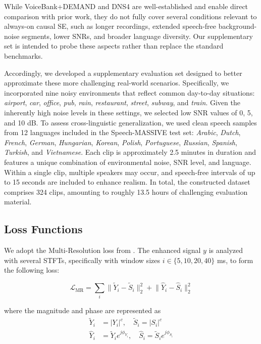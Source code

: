 \documentclass[final,5p,times,authoryear]{elsarticle}
\begin{document}
While VoiceBank+DEMAND and DNS4 are well-established and enable direct comparison with prior work, they do not fully cover several conditions relevant to always-on causal SE, such as longer recordings, extended speech-free background-noise segments, lower SNRs, and broader language diversity. Our supplementary set is intended to probe these aspects rather than replace the standard benchmarks.

Accordingly, we developed a supplementary evaluation set designed to better approximate these more challenging real-world scenarios. Specifically, we incorporated nine noisy environments that reflect common day-to-day situations: \textit{airport}, \textit{car}, \textit{office}, \textit{pub}, \textit{rain}, \textit{restaurant}, \textit{street}, \textit{subway}, and \textit{train}. Given the inherently high noise levels in these settings, we selected low SNR values of 0, 5, and 10 dB. To assess cross-linguistic generalization, we used clean speech samples from 12 languages included in the Speech-MASSIVE test set: \textit{Arabic}, \textit{Dutch}, \textit{French}, \textit{German}, \textit{Hungarian}, \textit{Korean}, \textit{Polish}, \textit{Portuguese}, \textit{Russian}, \textit{Spanish}, \textit{Turkish}, and \textit{Vietnamese}. Each clip is approximately 2.5 minutes in duration and features a unique combination of environmental noise, SNR level, and language. Within a single clip, multiple speakers may occur, and speech-free intervals of up to 15 seconds are included to enhance realism. In total, the constructed dataset comprises 324 clips, amounting to roughly 13.5 hours of challenging evaluation material.

\subsection{Loss Functions}
\label{sec:loss_functions}
We adopt the Multi-Resolution loss from  \citep{DeepFilterNet2}. The enhanced signal $y$ is  analyzed with several STFTs, specifically with window sizes $i \in \{5, 10, 20, 40 \}$ ms, to form the following loss: 

\begin{equation}
\mathcal{L}_{\mathrm{MR}}
= \sum_{i} \Big\| \widetilde{Y}_i - \widetilde{S}_i \Big\|_2^{2}
+
\Big\| \widehat{Y}_i - \widehat{S}_i \Big\|_2^{2}
\end{equation}

where the magnitude and phase are represented as 
\begin{align}
\widetilde{Y}_i&=|Y_i|^{c},\quad
\widetilde{S}_i=|S_i|^{c} \\
\widehat{Y}_i&=\widetilde{Y}_i e^{j\phi_{Y_i}},\quad
\widehat{S}_i=\widetilde{S}_i e^{j\phi_{S_i}}
\end{align}
\end{document}
